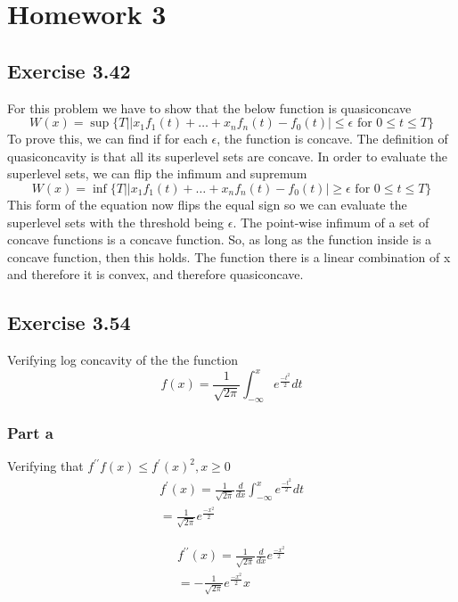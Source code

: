 \section{Homework 3}
\subsection{Exercise 3.42}
For this problem we have to show that the below function is quasiconcave
\begin{equation}
  W(x) = \sup \{ T | |x_1 f_1(t) + \dots + x_n f_n(t) - f_0(t)| \leq \epsilon \text{ for } 0 \leq t \leq T \}
\end{equation}
To prove this, we can find if for each $\epsilon$, the function is concave. The definition of quasiconcavity is that all its superlevel sets are concave. In order to evaluate the superlevel sets, we can flip the infimum and supremum
\begin{equation}
  W(x) = \inf \{ T | |x_1 f_1(t) + \dots + x_n f_n(t) - f_0(t)| \geq \epsilon \text{ for } 0 \leq t \leq T \}
\end{equation}
This form of the equation now flips the equal sign so we can evaluate the superlevel sets with the threshold being $\epsilon$. The point-wise infimum of a set of concave functions is a concave function. So, as long as the function inside is a concave function, then this holds. The function there is a linear combination of x and therefore it is convex, and therefore quasiconcave.

\subsection{Exercise 3.54}
Verifying log concavity of the the function
\begin{equation}
  f(x) = \frac{1}{\sqrt{2\pi}} \int_{-\infty}^{x} e^\frac{-t^2}{2} dt
\end{equation}
\subsubsection{Part a}
Verifying that $f^{\prime \prime} f(x) \leq f^\prime(x)^2, x \geq 0$
\begin{gather}
  f^\prime(x) = \frac{1}{\sqrt{2\pi}} \frac{d }{d x}  \int_{-\infty}^{x} e^\frac{-t^2}{2} dt \\
  = \frac{1}{\sqrt{2\pi}} e^\frac{-x^2}{2}
\end{gather}

\begin{gather}
  f^{\prime \prime}(x) = \frac{1}{\sqrt{2\pi}} \frac{d }{d x} e^\frac{-x^2}{2} \\
  = - \frac{1}{\sqrt{2\pi}} e^\frac{-x^2}{2}x
\end{gather}

